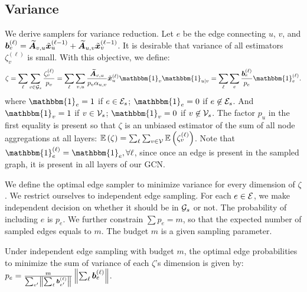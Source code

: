 
\subsection{Variance}
\label{sec: var}
We derive samplers for variance reduction. Let $e$ be the edge connecting $u$, $v$, and $\bm{b}_e^{(\ell)} = \Anorm_{v, u}\Tilde{\bm{x}}_u^{(\ell-1)} + \Anorm_{u, v}\Tilde{\bm{x}}_v^{(\ell-1)}$. It is desirable that variance of all estimators $\zeta_{v}^{(\ell)}$ is small. With this objective, we define:
\begin{equation}
    \zeta =  \sum_{\ell} \sum_{v \in \G[s]} \frac{\zeta_{v}^{(\ell)}}{p_v} = \sum_{\ell} \sum_{v, u}\frac{\Anorm_{v,u}}{p_v\alpha_{u,v}} \Tilde{\bm{x}}_u^{\paren{\ell}} \mathbbm{1}_{v}\mathbbm{1}_{u|v} = \sum_{\ell}\sum_e \frac{\bm{b}_e^{(\ell)}}{p_e} \mathbbm{1}_{e}^{\paren{\ell}}.
\end{equation}
where $\mathbbm{1}_{e}=1$ if $e\in\E[s]$; $\mathbbm{1}_{e}=0$ if $e\not\in\E[s]$. And $\mathbbm{1}_v=1$ if $v\in\V[s]$; $\mathbbm{1}_v=0$ if $v\not\in\V[s]$. The factor $p_u$ in the first equality is present so that $\zeta$ is an unbiased estimator of the sum of all node aggregations at all layers: $\mathbb{E}\paren{\zeta} = \sum_\ell \sum_{v\in\V} \mathbb{E}\paren{\zeta_v^{(\ell)}}$. Note that $\mathbbm{1}_{e}^{\paren{\ell}} = \mathbbm{1}_e, \forall \ell$, since once an edge is present in the sampled graph, it is present in all layers of our GCN. 

We define the optimal edge sampler to minimize variance for every dimension of $\zeta$. We restrict ourselves to independent edge sampling. For each $e\in\E$, we make independent decision on whether it should be in $\G[s]$ or not. The probability of including $e$ is $p_e$. We further constrain $\sum p_e=m$, so that the expected number of sampled edges equals to $m$. The budget $m$ is a given sampling parameter. 


\begin{theorem}
\label{thm: var}
Under independent edge sampling with budget $m$, the optimal edge probabilities to minimize the sum of variance of each $\zeta$'s dimension  is given by: $p_e=\frac{m}{\sum_{e'}\left\lVert\sum_{\ell}\bm{b}_{e'}^{\left( \ell \right)}\right\rVert}\left\lVert\sum_{\ell}\bm{b}_e^{\left( \ell \right)}\right\rVert$.
\end{theorem}

